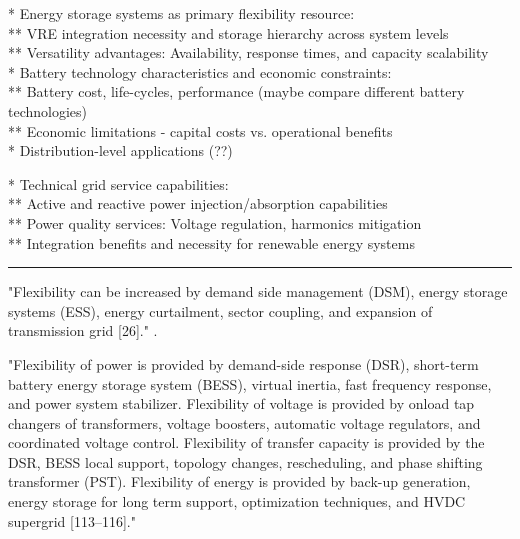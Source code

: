 * Energy storage systems as primary flexibility resource: \\
** VRE integration necessity and storage hierarchy across system levels \\
** Versatility advantages: Availability, response times, and capacity scalability \\

* Battery technology characteristics and economic constraints: \\
** Battery cost, life-cycles, performance (maybe compare different battery technologies) \\
** Economic limitations - capital costs vs. operational benefits \\
* Distribution-level applications (??)

* Technical grid service capabilities: \\
** Active and reactive power injection/absorption capabilities \\
** Power quality services: Voltage regulation, harmonics mitigation \\
** Integration benefits and necessity for renewable energy systems


\hrule


"Flexibility can be increased by demand side management (DSM), energy storage systems (ESS), energy curtailment, sector coupling, and expansion of transmission grid [26]." \cite{kaushik_comprehensive_2022}.

"Flexibility of power is provided by demand-side response (DSR), short-term battery energy storage system (BESS), virtual inertia, fast frequency response, and power system stabilizer. Flexibility of voltage is provided by onload tap changers of transformers, voltage boosters, automatic voltage regulators, and coordinated voltage control. Flexibility of transfer capacity is provided by the DSR, BESS local support, topology changes, rescheduling, and phase shifting transformer (PST). Flexibility of energy is provided by back-up generation, energy storage for long term support, optimization techniques, and HVDC supergrid [113–116]." \cite{kaushik_comprehensive_2022}

